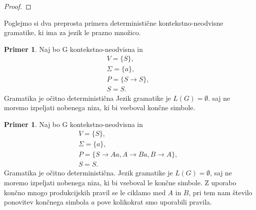 \documentclass{amsart}
\theoremstyle{definition}
\newtheorem{primer}[definicija]{Primer}
\theoremstyle{plain} %
\begin{document}
\begin{proof}


    
\end{proof}

Poglejmo si dva preprosta primera deterministične kontekstno-neodvisne gramatike, ki ima za jezik le prazno množico.

\begin{primer}
    Naj bo G kontekstno-neodvisna in 
    \begin{gather*}
        V = \{ S \}, \\
        \Sigma = \{ a \}, \\
        P = \{ S \rightarrow S \}, \\
        S = S.
    \end{gather*}
    Gramatika je očitno deterministična Jezik gramatike je $ L(G) = \emptyset $. saj ne moremo izpeljati
    nobenega niza, ki bi vseboval končne simbole.
\end{primer}

\begin{primer}\label{deterministična}
    Naj bo G kontekstno-neodvisna in 
    \begin{gather*}
        V = \{ S \}, \\
        \Sigma = \{ a \}, \\
        P = \{ S \rightarrow Aa, A \rightarrow Ba, B \rightarrow A \}, \\
        S = S.
    \end{gather*}
    Gramatika je očitno deterministična. Jezik gramatike je $ L(G) = \emptyset $, saj ne moremo izpeljati
    nobenega niza, ki bi vseboval le končne simbole. Z uporabo končno mnogo produkcijskih pravil se le 
    ciklamo med $A$ in $B$, pri tem nam število ponovitev končnega simbola $a$ pove kolikokrat smo uporabili
    pravila.
\end{primer}
\end{document}
